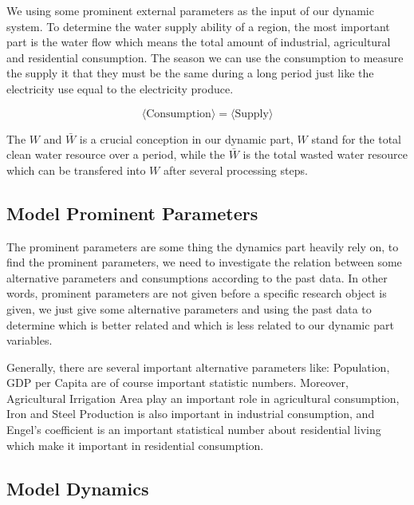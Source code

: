     We using some prominent external parameters as the input of our dynamic system. To determine the water supply ability of a region, the most important part is the water flow which means the total amount of industrial, agricultural and residential consumption. The season we can use the consumption to measure the supply it that they must be the same during a long period just like the electricity use equal to the electricity produce.

    $$
    \langle \text{Consumption}\rangle = \langle \text{Supply} \rangle
    $$

    The $W$ and $\bar{W}$ is a crucial conception in our dynamic part, $W$ stand for the total clean water resource over a period, while the $\bar{W}$ is the total wasted water resource which can be transfered into $W$ after several processing steps.

  \subsection{Model Prominent Parameters}

    The prominent parameters are some thing the dynamics part heavily rely on, to find the prominent parameters, we need to investigate the relation between some alternative parameters and consumptions according to the past data. In other words, prominent parameters are not given before a specific research object is given, we just give some alternative parameters and using the past data to determine which is better related and which is less related to our dynamic part variables.

    Generally, there are several important alternative parameters like: Population, GDP per Capita are of course important statistic numbers. Moreover, Agricultural Irrigation Area play an important role in agricultural consumption, Iron and Steel Production is also important in industrial consumption, and Engel's coefficient is an important statistical number about residential living which make it important in residential consumption.

  \subsection{Model Dynamics}

